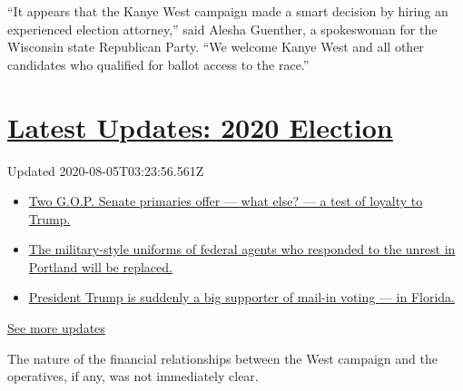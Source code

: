 ``It appears that the Kanye West campaign made a smart decision by
hiring an experienced election attorney,'' said Alesha Guenther, a
spokeswoman for the Wisconsin state Republican Party. ``We welcome Kanye
West and all other candidates who qualified for ballot access to the
race.''

\hypertarget{latest-updates-2020-election}{%
\section{\texorpdfstring{\href{https://www.nytimes3xbfgragh.onion/2020/08/04/us/elections/primary-election-michigan-arizona-kansas.html?action=click\&pgtype=Article\&state=default\&region=MAIN_CONTENT_1\&context=storylines_live_updates}{Latest
Updates: 2020
Election}}{Latest Updates: 2020 Election}}\label{latest-updates-2020-election}}

Updated 2020-08-05T03:23:56.561Z

\begin{itemize}
\tightlist
\item
  \href{https://www.nytimes3xbfgragh.onion/2020/08/04/us/elections/primary-election-michigan-arizona-kansas.html?action=click\&pgtype=Article\&state=default\&region=MAIN_CONTENT_1\&context=storylines_live_updates\#link-3924dd44}{Two
  G.O.P. Senate primaries offer --- what else? --- a test of loyalty to
  Trump.}
\item
  \href{https://www.nytimes3xbfgragh.onion/2020/08/04/us/elections/primary-election-michigan-arizona-kansas.html?action=click\&pgtype=Article\&state=default\&region=MAIN_CONTENT_1\&context=storylines_live_updates\#link-62a8e06b}{The
  military-style uniforms of federal agents who responded to the unrest
  in Portland will be replaced.}
\item
  \href{https://www.nytimes3xbfgragh.onion/2020/08/04/us/elections/primary-election-michigan-arizona-kansas.html?action=click\&pgtype=Article\&state=default\&region=MAIN_CONTENT_1\&context=storylines_live_updates\#link-32b39e33}{President
  Trump is suddenly a big supporter of mail-in voting --- in Florida.}
\end{itemize}

\href{https://www.nytimes3xbfgragh.onion/2020/08/04/us/elections/primary-election-michigan-arizona-kansas.html?action=click\&pgtype=Article\&state=default\&region=MAIN_CONTENT_1\&context=storylines_live_updates}{See
more updates}

The nature of the financial relationships between the West campaign and
the operatives, if any, was not immediately clear.

